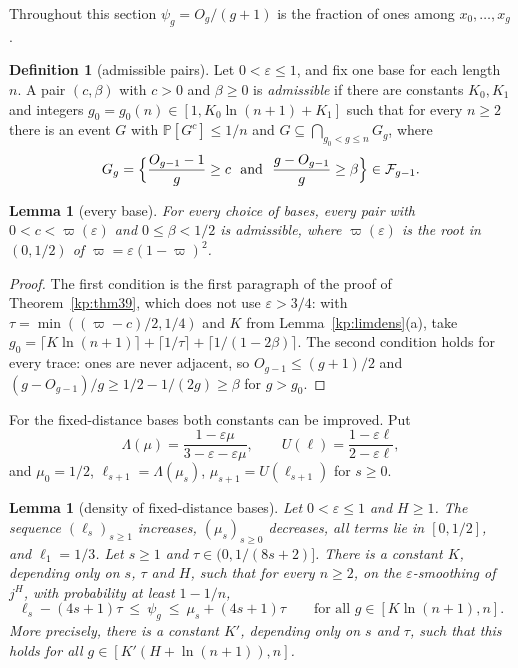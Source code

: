 \documentclass[11pt]{amsart}
\newtheorem{lemma}[theorem]{Lemma}
\theoremstyle{definition}
\newtheorem{definition}[theorem]{Definition}
\theoremstyle{remark}
\newcommand{\eps}{\varepsilon}
\newcommand{\PP}{\mathbb{P}}
\newcommand{\cF}{\mathcal{F}}
\begin{document}
Throughout this section $\psi_g=O_g/(g+1)$ is the fraction of ones among $x_0,\dots,x_g$.

\begin{definition}[admissible pairs]\label{def:admissible}
Let $0<\eps\le1$, and fix one base for each length $n$. A pair $(c,\beta)$ with $c>0$ and
$\beta\ge0$ is \emph{admissible} if there are constants $K_0,K_1$ and integers
$g_0=g_0(n)\in[1,K_0\ln(n+1)+K_1]$ such that for every $n\ge2$ there is an event $G$ with
$\PP[G^c]\le1/n$ and $G\subseteq\bigcap_{g_0<g\le n}G_g$, where
\[
G_g=\Bigl\{\frac{O_{g-1}-1}{g}\ge c\ \text{ and }\ \frac{g-O_{g-1}}{g}\ge\beta\Bigr\}\in\cF_{g-1}.
\]
\end{definition}

\begin{lemma}[every base]\label{fact:densall}
For every choice of bases, every pair with $0<c<\varpi(\eps)$ and $0\le\beta<1/2$ is admissible,
where $\varpi(\eps)$ is the root in $(0,1/2)$ of $\varpi=\eps(1-\varpi)^2$.
\end{lemma}

\begin{proof}
The first condition is the first paragraph of the proof of Theorem~\ref{kp:thm39}, which does
not use $\eps>3/4$: with $\tau=\min((\varpi-c)/2,1/4)$ and $K$ from Lemma~\ref{kp:limdens}(a), take
$g_0=\lceil K\ln(n+1)\rceil+\lceil1/\tau\rceil+\lceil1/(1-2\beta)\rceil$. The second condition
holds for every trace: ones are never adjacent, so $O_{g-1}\le(g+1)/2$ and
$(g-O_{g-1})/g\ge1/2-1/(2g)\ge\beta$ for $g>g_0$.
\end{proof}

For the fixed-distance bases both constants can be improved. Put
\[
\Lambda(\mu)=\frac{1-\eps\mu}{3-\eps-\eps\mu},\qquad U(\ell)=\frac{1-\eps\ell}{2-\eps\ell},
\]
and $\mu_0=1/2$, $\ell_{s+1}=\Lambda(\mu_s)$, $\mu_{s+1}=U(\ell_{s+1})$ for $s\ge0$.

\begin{lemma}[density of fixed-distance bases]\label{lem:fddens}
Let $0<\eps\le1$ and $H\ge1$. The sequence $(\ell_s)_{s\ge1}$ increases, $(\mu_s)_{s\ge0}$
decreases, all terms lie in $[0,1/2]$, and $\ell_1=1/3$. Let $s\ge1$ and $\tau\in(0,1/(8s+2)]$.
There is a constant $K$, depending only on $s$, $\tau$ and $H$, such that for every $n\ge2$, on
the $\eps$-smoothing of $j^H$, with probability at least $1-1/n$,
\[
\ell_s-(4s+1)\tau\ \le\ \psi_g\ \le\ \mu_s+(4s+1)\tau\qquad\text{for all }g\in[K\ln(n+1),n].
\]
More precisely, there is a constant $K'$, depending only on $s$ and $\tau$, such that this holds
for all $g\in[K'(H+\ln(n+1)),n]$.
\end{lemma}
\end{document}
